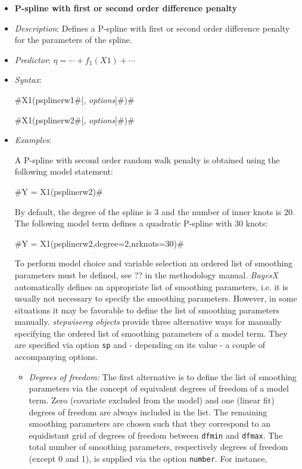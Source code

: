 \begin{itemize}
\item[] {\bf\sffamily P-spline with first or second order difference penalty}
\label{psplines_stepwise}

\item[] {\em Description}: Defines a P-spline with first or second
order difference penalty for the parameters of the spline.
\item[] {\em Predictor}: $\eta =  \cdots + f_1(X1) + \cdots$
\item[] {\em Syntax}:

#X1(psplinerw1#[, {\em options}]#)#

#X1(psplinerw2#[, {\em options}]#)#
\item[] {\em Examples}:

A P-spline with second order random walk penalty is
obtained using the following model statement:

#Y = X1(psplinerw2)#

By default, the degree of the spline is 3 and the number of inner
knots is 20. The following model term defines a quadratic P-spline
with 30 knots:

#Y = X1(psplinerw2,degree=2,nrknots=30)#

To perform model choice and variable selection an ordered list of smoothing parameters must be defined, see ??
in the methodology manual. {\em BayesX} automatically defines an appropriate list of smoothing parameters, i.e. it
is usually not necessary to  specify the smoothing parameters. However, in some situations it may be favorable to
define the list of smoothing parameters manually. {\em stepwisereg objects} provide three alternative ways for
manually specifying the ordered list of smoothing parameters of a model term. They are specified via option
{\tt sp} and - depending on its value - a couple of accompanying options.

\begin{itemize}
\item {\em Degrees of freedom:} The first alternative is to define the list of  smoothing parameters via the concept of
equivalent degrees of freedom of a model term. Zero (covariate excluded from the model) and one (linear fit)
degrees of freedom are always included in the list. The remaining smoothing parameters  are chosen such that they
correspond to an equidistant grid of degrees of freedom between {\tt dfmin} and {\tt dfmax}. The total
number of smoothing parameters, respectively degrees of freedom (except 0 and 1), is supplied via the option {\tt number}.
For instance,


\end{itemize}
\end{itemize}
